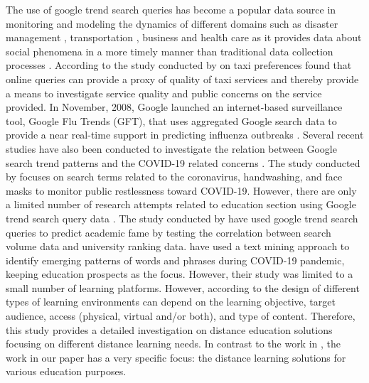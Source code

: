 \documentclass[11pt,a4paper,]{article}
\begin{document}
The use of google trend search queries has become a popular data source in monitoring and modeling the dynamics of different domains such as disaster management \autocite{kam2019monitoring}, transportation \autocite{willis2020using}, business \autocite{chumnumpan2019understanding} and health care \autocite{nuti2014use,alicino2015assessing,arora2019google,carneiro2009google,cook2011assessing} as it provides data about social phenomena in a more timely manner than traditional data collection processes \autocite{vaughan2014web}. According to the study conducted by \textcite{willis2020using} on taxi preferences found that online queries can provide a proxy of quality of taxi services and thereby provide a means to investigate service quality and public concerns on the service provided. In November, 2008, Google launched an internet-based surveillance tool, Google Flu Trends (GFT), that uses aggregated Google search data to provide a near real-time support in predicting influenza outbreaks \autocite{cook2011assessing}. Several recent studies have also been conducted to investigate the relation between Google search trend patterns and the COVID-19 related concerns \autocite{husnayain2020applications,effenberger2020association}. The study conducted by \textcite{husnayain2020applications} focuses on search terms related to the coronavirus, handwashing, and face masks to monitor public restlessness toward COVID-19. However, there are only a limited number of research attempts related to education section using Google trend search query data \autocite{vaughan2014web}. The study conducted by \textcite{vaughan2014web} have used google trend search queries to predict academic fame by testing the correlation between search volume data and university ranking data. \textcite{kansal2021google} have used a text mining approach to identify emerging patterns of words and phrases during COVID-19 pandemic, keeping education prospects as the focus. However, their study was limited to a small number of learning platforms. However, according to \textcite{moore2011learning} the design of different types of learning environments can depend on the learning objective, target audience, access (physical, virtual and/or both), and type of content. Therefore, this study provides a detailed investigation on distance education solutions focusing on different distance learning needs. In contrast to the work in \textcite{kansal2021google}, the work in our paper has a very specific focus: the distance learning solutions for various education purposes.
\end{document}
